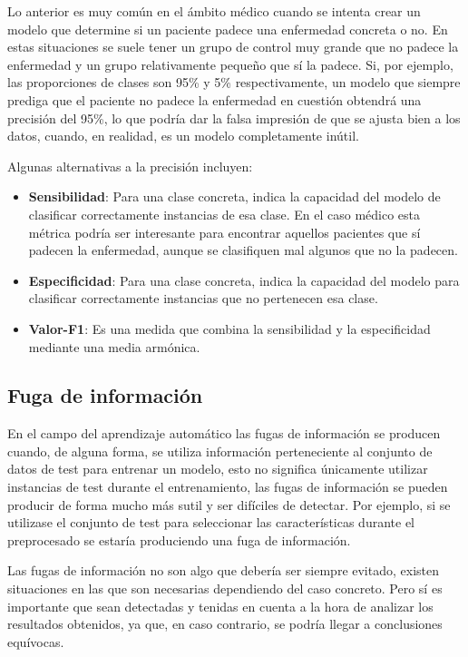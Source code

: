 Lo anterior es muy común en el ámbito médico cuando se intenta crear un modelo
que determine si un paciente padece una enfermedad concreta o no. En estas
situaciones se suele tener un grupo de control muy grande que no padece la
enfermedad y un grupo relativamente pequeño que sí la padece. Si, por ejemplo,
las proporciones de clases son 95\% y 5\% respectivamente, un modelo que siempre
prediga que el paciente no padece la enfermedad en cuestión obtendrá una
precisión del 95\%, lo que podría dar la falsa impresión de que se ajusta bien a
los datos, cuando, en realidad, es un modelo completamente inútil.

Algunas alternativas a la precisión incluyen:

\begin{itemize}
    \item \textbf{Sensibilidad}: Para una clase concreta, indica la capacidad
    del modelo de clasificar correctamente instancias de esa clase. En el caso
    médico esta métrica podría ser interesante para encontrar aquellos pacientes
    que sí padecen la enfermedad, aunque se clasifiquen mal algunos que no la
    padecen.
    \item \textbf{Especificidad}: Para una clase concreta, indica la capacidad
    del modelo para clasificar correctamente instancias que no pertenecen esa
    clase.
    \item \textbf{Valor-F1}: Es una medida que combina la sensibilidad y la
    especificidad mediante una media armónica.
\end{itemize}

\subsection{Fuga de información}

En el campo del aprendizaje automático las fugas de información se producen
cuando, de alguna forma, se utiliza información perteneciente al conjunto de
datos de test para entrenar un modelo, esto no significa únicamente utilizar
instancias de test durante el entrenamiento, las fugas de información se pueden
producir de forma mucho más sutil y ser difíciles de detectar. Por ejemplo, si
se utilizase el conjunto de test para seleccionar las características durante el
preprocesado se estaría produciendo una fuga de información.

Las fugas de información no son algo que debería ser siempre evitado, existen
situaciones en las que son necesarias dependiendo del caso concreto. Pero sí es
importante que sean detectadas y tenidas en cuenta a la hora de analizar los
resultados obtenidos, ya que, en caso contrario, se podría llegar a conclusiones
equívocas.

